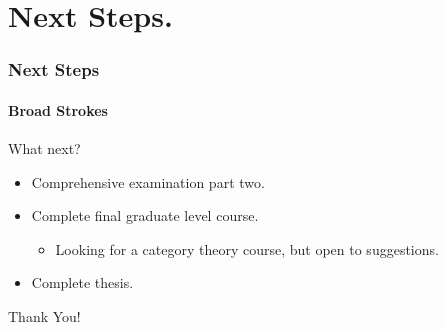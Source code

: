 \documentclass{beamer}
\begin{document}

\section[Next Steps]{Next Steps.}


\begin{frame}

\frametitle{Next Steps}
\framesubtitle{Broad Strokes}


\begin{Large}
What next?
\end{Large}

\begin{itemize}
\item Comprehensive examination part two.
\item Complete final graduate level course.
\begin{itemize}
\item Looking for a category theory course, but open to suggestions.
\end{itemize}
\item Complete thesis.
\end{itemize}
\end{frame}


\begin{frame}
\begin{center}
\Huge Thank You!
\end{center}
\end{frame}

\end{document}
